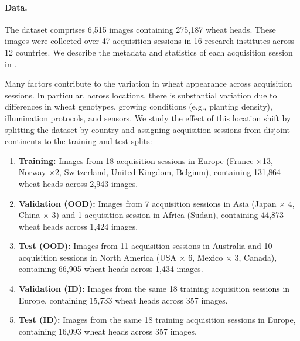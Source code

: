 \paragraph{Data.}
The dataset comprises 6,515 images containing 275,187 wheat heads.
These images were collected over 47 acquisition sessions in 16 research institutes across 12 countries. We describe the metadata and statistics of each acquisition session in .

Many factors contribute to the variation in wheat appearance across acquisition sessions.
In particular, across locations, there is substantial variation due to differences in wheat genotypes, growing conditions (e.g., planting density), illumination protocols, and sensors.
We study the effect of this location shift by splitting the dataset by country
and assigning acquisition sessions from disjoint continents to the training and test splits:
\begin{enumerate}
\item	\textbf{Training:} Images from 18 acquisition sessions in Europe (France $\times$13, Norway $\times$2, Switzerland, United Kingdom, Belgium), containing 131,864 wheat heads across  2,943 images.
\item \textbf{Validation (OOD):}
Images from 7 acquisition sessions in Asia (Japan $\times$ 4, China $\times$ 3) and 1 acquisition session in Africa (Sudan), containing 44,873 wheat heads across 1,424 images.
\item \textbf{Test (OOD):} Images from 11 acquisition sessions in Australia and 10 acquisition sessions in North America (USA $\times$ 6, Mexico $\times$ 3, Canada), containing 66,905 wheat heads across 1,434 images.
\item \textbf{Validation (ID):} Images from the same 18 training acquisition sessions in Europe, containing 15,733 wheat heads across 357 images.
\item \textbf{Test (ID):} Images from the same 18 training acquisition sessions in Europe, containing 16,093 wheat heads across 357 images.
\end{enumerate}


